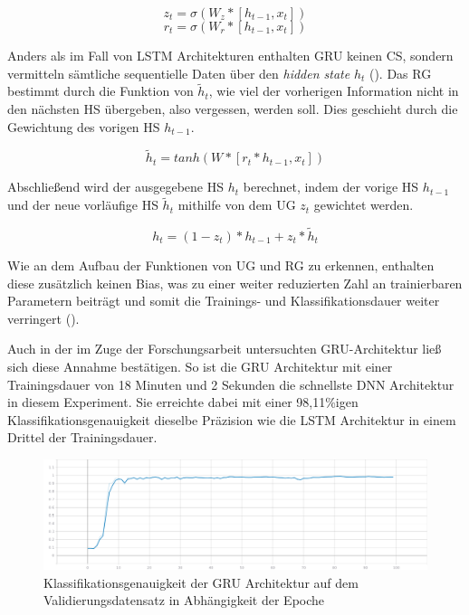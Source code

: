 $$z_t=\sigma(W_z*[h_{t-1}, x_t])$$ 
$$r_t=\sigma(W_r*[h_{t-1}, x_t])$$ 

Anders als im Fall von LSTM Architekturen enthalten GRU keinen CS, sondern vermitteln sämtliche sequentielle Daten über den \textit{hidden state} $h_t$ (\cite{simao2019emg}). Das RG bestimmt durch die Funktion von $\widetilde{h}_t$, wie viel der vorherigen Information nicht in den nächsten HS übergeben, also vergessen, werden soll. Dies geschieht durch die Gewichtung des vorigen HS $h_{t-1}$.

$$\widetilde{h}_t=tanh(W*[r_t*h_{t-1}, x_t])$$

Abschließend wird der ausgegebene HS $h_t$ berechnet, indem der vorige HS $h_{t-1}$ und der neue vorläufige HS $\widetilde{h}_t$ mithilfe von dem UG $z_t$ gewichtet werden.

$$h_t=(1-z_t)*h_{t-1}+z_t*\widetilde{h}_t$$

Wie an dem Aufbau der Funktionen von UG und RG zu erkennen, enthalten diese zusätzlich keinen Bias, was zu einer weiter reduzierten Zahl an trainierbaren Parametern beiträgt und somit die Trainings- und Klassifikationsdauer weiter verringert (\cite{simao2019emg}).

Auch in der im Zuge der Forschungsarbeit untersuchten GRU-Architektur ließ sich diese Annahme bestätigen. So ist die GRU Architektur mit einer Trainingsdauer von 18 Minuten und 2 Sekunden die schnellste DNN Architektur in diesem Experiment. Sie erreichte dabei mit einer 98,11\%igen Klassifikationsgenauigkeit dieselbe Präzision wie die LSTM Architektur in einem Drittel der Trainingsdauer.

\begin{figure}[h]
    \centering
    \includegraphics[scale=0.3]{grafiken/gru-acc.png}
    \caption{Klassifikationsgenauigkeit der GRU Architektur auf dem Validierungsdatensatz in Abhängigkeit der Epoche}
    \label{gru-acc}
\end{figure}